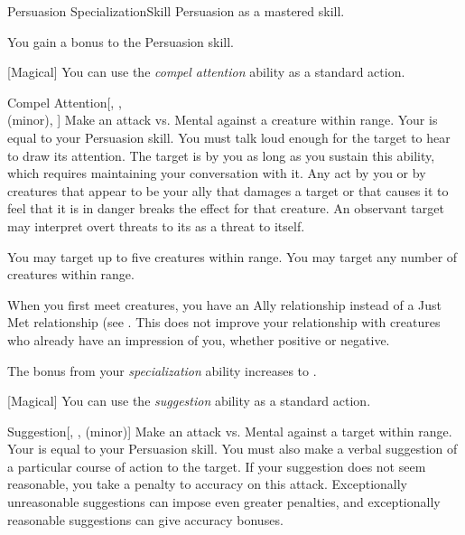     \begin{feat}{Persuasion Specialization}{Skill}
        \featpre Persuasion as a mastered skill.

         You gain a  bonus to the Persuasion skill.

        [Magical] You can use the \textit{compel attention} ability as a standard action.
        \begin{freeability}{Compel Attention}[, ,\\ (minor), ]
            Make an attack vs. Mental against a creature within \rngmed range.
            Your  is equal to your Persuasion skill.
            You must talk loud enough for the target to hear to draw its attention.
            \hit The target is  by you as long as you sustain this ability, which requires maintaining your conversation with it.
            Any act by you or by creatures that appear to be your ally that damages a target or that causes it to feel that it is in danger breaks the effect for that creature.
            An observant target may interpret overt threats to its  as a threat to itself.

            \rankline
             You may target up to five creatures within range.
             You may target any number of creatures within range.
        \end{freeability}

         When you first meet creatures, you have an Ally relationship instead of a Just Met relationship (see .
        This does not improve your relationship with creatures who already have an impression of you, whether positive or negative.

         The bonus from your \textit{specialization} ability increases to .

        [Magical] You can use the \textit{suggestion} ability as a standard action.
        \begin{freeability}{Suggestion}[, ,  (minor)]
            Make an attack vs. Mental against a target within \rngmed range.
            Your  is equal to your Persuasion skill.
            You must also make a verbal suggestion of a particular course of action to the target.
            If your suggestion does not seem reasonable, you take a  penalty to accuracy on this attack.
            Exceptionally unreasonable suggestions can impose even greater penalties, and exceptionally reasonable suggestions can give accuracy bonuses.


\end{freeability}
\end{feat}
